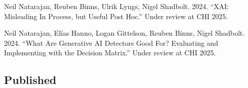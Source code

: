 Neil Natarajan, Reuben Binns, Ulrik Lyngs, Nigel Shadbolt. 2024. “XAI: Misleading In Process, but Useful Post Hoc.” Under review at CHI 2025. %

Neil Natarajan, Elías Hanno, Logan Gittelson, Reuben Binns, Nigel Shadbolt. 2024. “What Are Generative AI Detectors Good For? Evaluating and Implementing with the Decision Matrix.” Under review at CHI 2025. %

\subsection{Published}


